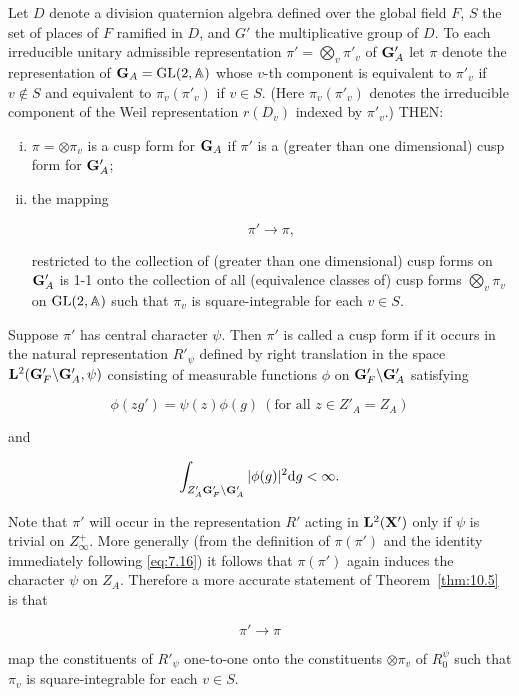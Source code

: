 \begin{theorem}\label{thm:10.5}

Let $D$ denote a division quaternion algebra defined over the global field $F$, $S$ the set of places of $F$ ramified in $D$, and $G'$ the multiplicative group of $D$. To each irreducible unitary admissible representation $\pi' = \bigotimes_v \pi'_v$ of $\mathbf{G}'_A$ let $\pi$ denote the representation of $\mathbf{G}_A = \operatorname{GL}(2, \mathbb{A})$ whose $v$-th component is equivalent to $\pi'_v$ if $v \notin S$ and equivalent to $\pi_v(\pi'_v)$ if $v \in S$. (Here $\pi_v(\pi'_v)$ denotes the irreducible component of the Weil representation $r(D_v)$ indexed by $\pi'_v$.) THEN:

\begin{enumerate}[(i)]

\item $\pi = \otimes \pi_v$ is a cusp form for $\mathbf{G}_A$ if $\pi'$ is a (greater than one dimensional) cusp form for $\mathbf{G}'_A$;

\item the mapping

\[
\pi' \to \pi,
\]

restricted to the collection of (greater than one dimensional) cusp forms on $\mathbf{G}'_A$ is 1-1 onto the collection of all (equivalence classes of) cusp forms $\bigotimes_v \pi_v$ on $\operatorname{GL}(2, \mathbb{A})$ such that $\pi_v$ is square-integrable for each $v \in S$.

\end{enumerate}

\end{theorem}

\begin{remark*}

Suppose $\pi'$ has central character $\psi$. Then $\pi'$ is called a cusp form if it occurs in the natural representation $R'_\psi$ defined by right translation in the space $\mathbf{L}^2(\mathbf{G}'_F \backslash \mathbf{G}'_A, \psi)$ consisting of measurable functions $\phi$ on $\mathbf{G}'_F \backslash \mathbf{G}'_A$ satisfying

\[
\phi(zg') = \psi(z)\phi(g) \ (\text{for all } z \in Z'_A = Z_A)
\]

and

\[
\int_{Z'_A \mathbf{G}'_F \backslash \mathbf{G}'_A} |\phi(g)|^2 \mathrm{d} g < \infty.
\]

Note that $\pi'$ will occur in the representation $R'$ acting in $\mathbf{L}^2(\mathbf{X}')$ only if $\psi$ is trivial on $Z_\infty^+$. More generally (from the definition of $\pi(\pi')$ and the identity immediately following \eqref{eq:7.16}) it follows that $\pi(\pi')$ again induces the character $\psi$ on $Z_A$. Therefore a more accurate statement of Theorem~\ref{thm:10.5} is that

\[
\pi' \to \pi
\]

map the constituents of $R'_\psi$ one-to-one onto the constituents $\otimes \pi_v$ of $R^{\psi}_0$ such that $\pi_v$ is square-integrable for each $v \in S$.

\end{remark*}

